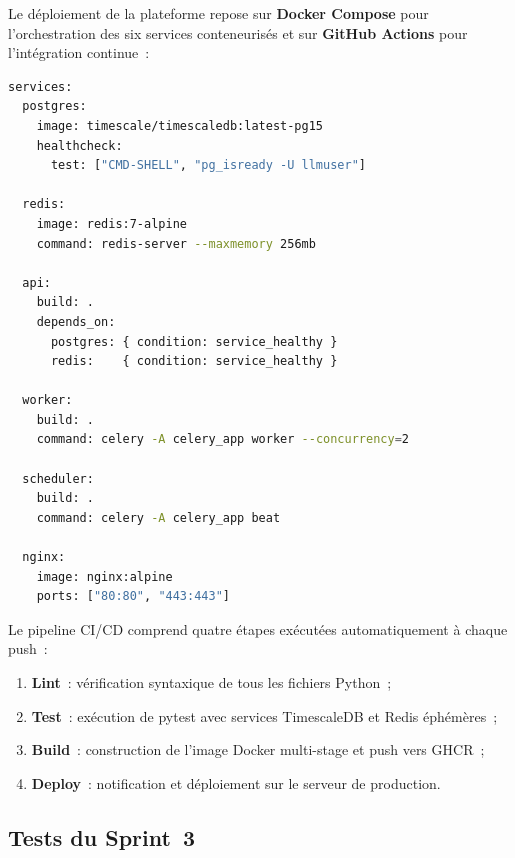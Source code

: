 Le déploiement de la plateforme repose sur \textbf{Docker Compose} pour l'orchestration des six services conteneurisés et sur \textbf{GitHub Actions} pour l'intégration continue~:

\begin{lstlisting}[language=bash, caption={Déploiement Docker Compose (extrait de docker-compose.yml)}]
services:
  postgres:
    image: timescale/timescaledb:latest-pg15
    healthcheck:
      test: ["CMD-SHELL", "pg_isready -U llmuser"]
  
  redis:
    image: redis:7-alpine
    command: redis-server --maxmemory 256mb
  
  api:
    build: .
    depends_on:
      postgres: { condition: service_healthy }
      redis:    { condition: service_healthy }
  
  worker:
    build: .
    command: celery -A celery_app worker --concurrency=2
  
  scheduler:
    build: .
    command: celery -A celery_app beat
  
  nginx:
    image: nginx:alpine
    ports: ["80:80", "443:443"]
\end{lstlisting}

Le pipeline CI/CD comprend quatre étapes exécutées automatiquement à chaque push~:

\begin{enumerate}[noitemsep]
    \item \textbf{Lint}~: vérification syntaxique de tous les fichiers Python~;
    \item \textbf{Test}~: exécution de pytest avec services TimescaleDB et Redis éphémères~;
    \item \textbf{Build}~: construction de l'image Docker multi-stage et push vers GHCR~;
    \item \textbf{Deploy}~: notification et déploiement sur le serveur de production.
\end{enumerate}


\subsection{Tests du Sprint~3}


